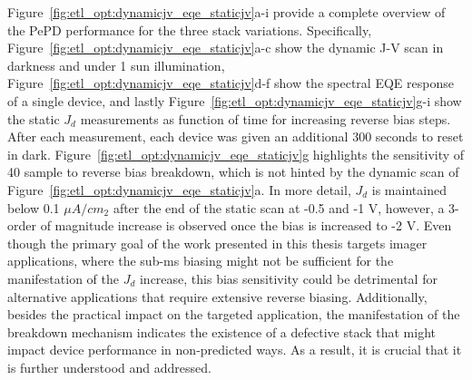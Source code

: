 Figure~\ref{fig:etl_opt:dynamicjv_eqe_staticjv}a-i provide a complete overview of the PePD performance for the three stack variations. Specifically, Figure~\ref{fig:etl_opt:dynamicjv_eqe_staticjv}a-c show the dynamic J-V scan in darkness and under 1 sun illumination, Figure~\ref{fig:etl_opt:dynamicjv_eqe_staticjv}d-f show the spectral EQE response of a single device, and lastly Figure~\ref{fig:etl_opt:dynamicjv_eqe_staticjv}g-i show the static $J_d$ measurements as function of time for increasing reverse bias steps. After each measurement, each device was given an additional 300 seconds to reset in dark. Figure~\ref{fig:etl_opt:dynamicjv_eqe_staticjv}g highlights the sensitivity of 40 sample to reverse bias breakdown, which is not  hinted by the dynamic scan of Figure~\ref{fig:etl_opt:dynamicjv_eqe_staticjv}a. In more detail, $J_d$ is maintained below 0.1 $\mu A/cm_2$ after the end of the static scan at -0.5 and -1 V, however, a 3-order of magnitude increase is observed once the bias is increased to -2 V. Even though the primary goal of the work presented in this thesis targets imager applications, where the sub-ms biasing might not be sufficient for the manifestation of the $J_d$ increase, this bias sensitivity could be detrimental for alternative applications that require extensive reverse biasing. Additionally, besides the practical impact on the targeted application, the manifestation of the breakdown mechanism indicates the existence of a defective stack that might impact device performance in non-predicted ways. As a result, it is crucial that it is further understood and addressed. 


